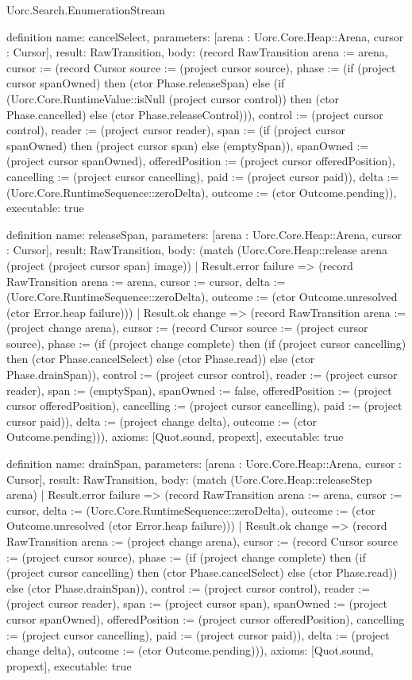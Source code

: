 \begin{lexlean}{Uorc.Search.EnumerationStream}
\begin{semanticmodule}
definition{
  name: cancelSelect,
  parameters: [arena : Uorc.Core.Heap::Arena, cursor : Cursor],
  result: RawTransition,
  body: (record RawTransition {arena := arena, cursor := (record Cursor {source := (project cursor source), phase := (if (project cursor spanOwned) then (ctor Phase.releaseSpan) else (if (Uorc.Core.RuntimeValue::isNull (project cursor control)) then (ctor Phase.cancelled) else (ctor Phase.releaseControl))), control := (project cursor control), reader := (project cursor reader), span := (if (project cursor spanOwned) then (project cursor span) else (emptySpan)), spanOwned := (project cursor spanOwned), offeredPosition := (project cursor offeredPosition), cancelling := (project cursor cancelling), paid := (project cursor paid)}), delta := (Uorc.Core.RuntimeSequence::zeroDelta), outcome := (ctor Outcome.pending)}),
  executable: true
}

definition{
  name: releaseSpan,
  parameters: [arena : Uorc.Core.Heap::Arena, cursor : Cursor],
  result: RawTransition,
  body: (match (Uorc.Core.Heap::release arena (project (project cursor span) image))
    | Result.error failure => (record RawTransition {arena := arena, cursor := cursor, delta := (Uorc.Core.RuntimeSequence::zeroDelta), outcome := (ctor Outcome.unresolved (ctor Error.heap failure))})
    | Result.ok change => (record RawTransition {arena := (project change arena), cursor := (record Cursor {source := (project cursor source), phase := (if (project change complete) then (if (project cursor cancelling) then (ctor Phase.cancelSelect) else (ctor Phase.read)) else (ctor Phase.drainSpan)), control := (project cursor control), reader := (project cursor reader), span := (emptySpan), spanOwned := false, offeredPosition := (project cursor offeredPosition), cancelling := (project cursor cancelling), paid := (project cursor paid)}), delta := (project change delta), outcome := (ctor Outcome.pending)})),
  axioms: [Quot.sound, propext],
  executable: true
}

definition{
  name: drainSpan,
  parameters: [arena : Uorc.Core.Heap::Arena, cursor : Cursor],
  result: RawTransition,
  body: (match (Uorc.Core.Heap::releaseStep arena)
    | Result.error failure => (record RawTransition {arena := arena, cursor := cursor, delta := (Uorc.Core.RuntimeSequence::zeroDelta), outcome := (ctor Outcome.unresolved (ctor Error.heap failure))})
    | Result.ok change => (record RawTransition {arena := (project change arena), cursor := (record Cursor {source := (project cursor source), phase := (if (project change complete) then (if (project cursor cancelling) then (ctor Phase.cancelSelect) else (ctor Phase.read)) else (ctor Phase.drainSpan)), control := (project cursor control), reader := (project cursor reader), span := (project cursor span), spanOwned := (project cursor spanOwned), offeredPosition := (project cursor offeredPosition), cancelling := (project cursor cancelling), paid := (project cursor paid)}), delta := (project change delta), outcome := (ctor Outcome.pending)})),
  axioms: [Quot.sound, propext],
  executable: true
}


\end{semanticmodule}
\end{lexlean}
